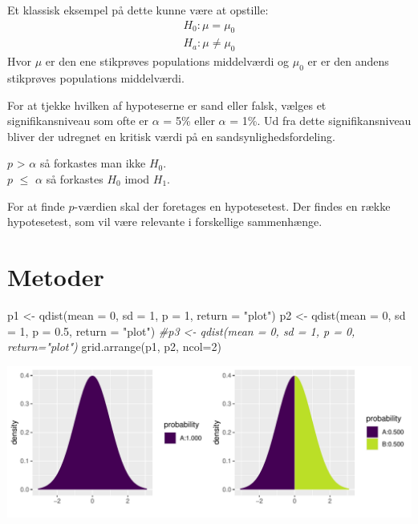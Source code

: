 \documentclass[
]{article}
\newenvironment{Shaded}{\begin{snugshade}}{\end{snugshade}}
\newcommand{\AttributeTok}[1]{\textcolor[rgb]{0.77,0.63,0.00}{#1}}
\newcommand{\CommentTok}[1]{\textcolor[rgb]{0.56,0.35,0.01}{\textit{#1}}}
\newcommand{\DecValTok}[1]{\textcolor[rgb]{0.00,0.00,0.81}{#1}}
\newcommand{\FloatTok}[1]{\textcolor[rgb]{0.00,0.00,0.81}{#1}}
\newcommand{\FunctionTok}[1]{\textcolor[rgb]{0.00,0.00,0.00}{#1}}
\newcommand{\NormalTok}[1]{#1}
\newcommand{\OtherTok}[1]{\textcolor[rgb]{0.56,0.35,0.01}{#1}}
\newcommand{\StringTok}[1]{\textcolor[rgb]{0.31,0.60,0.02}{#1}}
\begin{document}
Et klassisk eksempel på dette kunne være at opstille: \[
\begin{aligned}
H_0 : \mu = \mu_0
\\
H_a : \mu \not= \mu_0
\end{aligned}
\] Hvor \(\mu\) er den ene stikprøves populations middelværdi og
\(\mu_0\) er er den andens stikprøves populations middelværdi.

For at tjekke hvilken af hypoteserne er sand eller falsk, vælges et
signifikansniveau som ofte er \(\alpha\) = 5\% eller \(\alpha\) = 1\%.
Ud fra dette signifikansniveau bliver der udregnet en kritisk værdi på
en sandsynlighedsfordeling.

\(p\) \textgreater{} \(\alpha\) så forkastes man ikke \(H_0\).\\
\(p\) \(\le\) \(\alpha\) så forkastes \(H_0\) imod \(H_1\).

For at finde \(p\)-værdien skal der foretages en hypotesetest. Der
findes en række hypotesetest, som vil være relevante i forskellige
sammenhænge.

\hypertarget{metoder}{%
\section{Metoder}\label{metoder}}

\begin{Shaded}
\begin{Highlighting}[]
\NormalTok{p1 }\OtherTok{\textless{}{-}} \FunctionTok{qdist}\NormalTok{(}\AttributeTok{mean =} \DecValTok{0}\NormalTok{, }\AttributeTok{sd =} \DecValTok{1}\NormalTok{, }\AttributeTok{p =} \DecValTok{1}\NormalTok{, }\AttributeTok{return =} \StringTok{"plot"}\NormalTok{)}
\NormalTok{p2 }\OtherTok{\textless{}{-}} \FunctionTok{qdist}\NormalTok{(}\AttributeTok{mean =} \DecValTok{0}\NormalTok{, }\AttributeTok{sd =} \DecValTok{1}\NormalTok{, }\AttributeTok{p =} \FloatTok{0.5}\NormalTok{, }\AttributeTok{return =} \StringTok{"plot"}\NormalTok{)}
\CommentTok{\#p3 \textless{}{-} qdist(mean = 0, sd = 1, p = 0, return="plot")}
\FunctionTok{grid.arrange}\NormalTok{(p1, p2, }\AttributeTok{ncol=}\DecValTok{2}\NormalTok{)}
\end{Highlighting}
\end{Shaded}

\includegraphics{TP2_files/figure-latex/unnamed-chunk-15-1.pdf}
\end{document}

